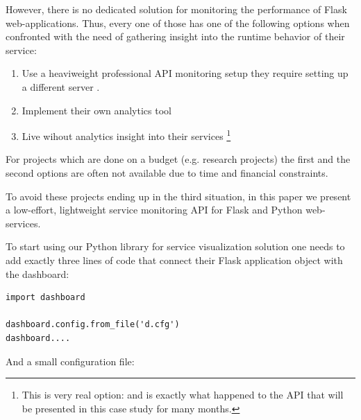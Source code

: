 \documentclass[conference]{IEEEtran}
\begin{document}
However, there is no dedicated solution for monitoring the performance of Flask web-applications. Thus, every one of those  has one of the following options when confronted with the need of gathering insight into the runtime behavior of their service: 

  \begin{enumerate}

    \item Use a heaviweight professional API monitoring setup they require setting up a different server . 

    \item Implement their own analytics tool 

    \item Live wihout analytics insight into their services \footnote{This is very real option: and is exactly what happened to the API that will be presented in this case study for many months. }

  \end{enumerate}

For projects which are done on a budget (e.g. research projects) the first and the second options are often not available due to time and financial constraints. 

To avoid these projects ending up in the third situation, in this paper we present a low-effort, lightweight service monitoring API for Flask and Python web-services.

To start using our Python library for service visualization solution one needs to add exactly three lines of code that connect their Flask application object with the dashboard:

\begin{lstlisting}[float,caption=TBA,style=custompython]
import dashboard

dashboard.config.from_file('d.cfg')
dashboard....

\end{lstlisting}


And a small configuration file: 

\end{document}
